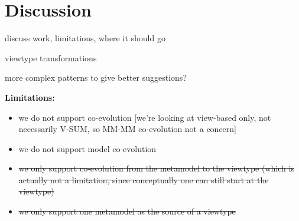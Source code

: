 \section{Discussion}
\label{sec:Discussion}

discuss work, limitations, where it should go

viewtype transformations

more complex patterns to give better suggestions?

\textbf{Limitations:}
\begin{itemize}
    \item we do not support \metamodel \metamodel co-evolution [we’re looking at view-based only, not necessarily V-SUM, so MM-MM co-evolution not a concern]
    \item we do not support \metamodel model co-evolution
    \item \st{we only support co-evolution from the metamodel to the viewtype (which is actually not a limitation, since conceptually one can still start at the viewtype)}
    \item \st{we only support one metamodel as the source of a viewtype}
\end{itemize}
